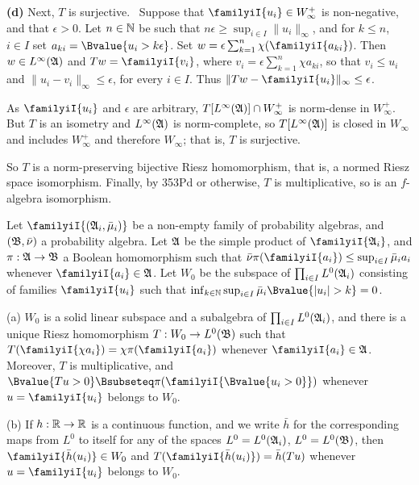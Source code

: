 {\medskip

{\bf (d)} Next, $T$ is surjective.   \Prf\
Suppose that $\familyiI{u_i}\in W_{\infty}^+$ is non-negative, and that
$\epsilon>0$.   Let $n\in\Bbb N$ be such that
$n\epsilon\ge\sup_{i\in I}\|u_i\|_{\infty}$, and for $k\le n$, $i\in I$ set
$a_{ki}=\Bvalue{u_i>k\epsilon}$.   Set
$w=\epsilon\sum_{k=1}^n\chi(\familyiI{a_{ki}})$.   Then
$w\in L^{\infty}(\frak A)$ and $Tw=\familyiI{v_i}$, where
$v_i=\epsilon\sum_{k=1}^n\chi a_{ki}$, so that $v_i\le u_i$ and
$\|u_i-v_i\|_{\infty}\le\epsilon$, for every $i\in I$.
Thus $\|Tw-\familyiI{u_i}\|_{\infty}\le\epsilon$.

As $\familyiI{u_i}$ and $\epsilon$ are arbitrary,
$T[L^{\infty}(\frak A)]\cap W_{\infty}^+$ is norm-dense in $W_{\infty}^+$.
But $T$ is an isometry and $L^{\infty}(\frak A)$ is norm-complete, so
$T[L^{\infty}(\frak A)]$ is closed in $W_{\infty}$ and includes
$W_{\infty}^+$ and therefore $W_{\infty}$;  that is, $T$ is surjective.\
\Qed

So $T$ is a norm-preserving bijective Riesz homomorphism, that is, a normed
Riesz space isomorphism.   Finally, by 353Pd or otherwise, $T$ is
multiplicative, so is an $f$-algebra isomorphism.
}%

 Let $\familyiI{(\frak A_i,\bar\mu_i)}$ be a
non-empty
family of probability algebras, and $(\frak B,\bar\nu)$ a probability
algebra.   Let $\frak A$ be the simple product of $\familyiI{\frak A_i}$,
and $\pi:\frak A\to\frak B$ a Boolean homomorphism such that
$\bar\nu\pi(\familyiI{a_i})\le\sup_{i\in I}\bar\mu_ia_i$ whenever
$\familyiI{a_i}\in\frak A$.
Let $W_0$ be the subspace of $\prod_{i\in I}L^0(\frak A_i)$ consisting
of families $\familyiI{u_i}$ such that
$\inf_{k\in\Bbb N}\sup_{i\in I}\bar\mu_i\Bvalue{|u_i|>k}=0$.

(a) $W_0$ is
a solid linear subspace and a subalgebra of $\prod_{i\in I}L^0(\frak A_i)$,
and there is a unique Riesz homomorphism
$T:W_0\to L^0(\frak B)$ such that
$T(\familyiI{\chi a_i})=\chi\pi(\familyiI{a_i})$ whenever
$\familyiI{a_i}\in\frak A$.   Moreover, $T$ is multiplicative,
and $\Bvalue{Tu>0}\Bsubseteq\pi(\familyiI{\Bvalue{u_i>0}})$ whenever
$u=\familyiI{u_i}$ belongs to $W_0$.

(b) If $h:\Bbb R\to\Bbb R$ is a continuous function, and we write
$\bar h$ for the corresponding maps from $L^0$ to itself for any of the
spaces $L^0=L^0(\frak A_i)$, $L^0=L^0(\frak B)$\cmmnt{ (364H)}, then
$\familyiI{\bar h(u_i)}\in W_0$ and
$T(\familyiI{\bar h(u_i)})=\bar h(Tu)$ whenever
$u=\familyiI{u_i}$ belongs to $W_0$.

